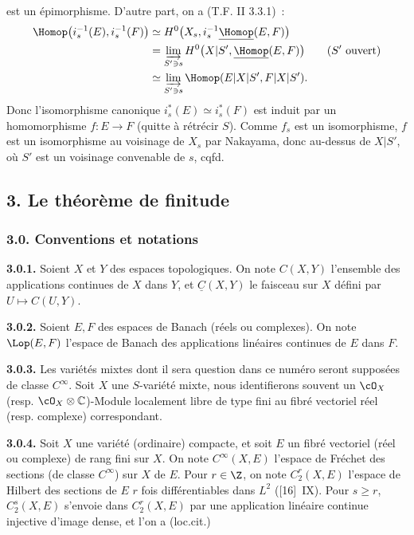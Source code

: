 est un
épimorphisme. D'autre part, on a (T.F. II 3.3.1)~:
\[
\begin{aligned}
  \Homop\bigl(i_s^{-1}(E),i_s^{-1}(F)\bigr)
  &\simeq H^0\bigl(X_s,i_s^{-1}\underline{\Homop}(E,F)\bigr)\\
  &=\varinjlim_{S'\ni s} H^0\bigl(X|S',\underline{\Homop}(E,F)\bigr)\qquad (S'\ \text{ouvert})\\
  &\simeq \varinjlim_{S'\ni s}\Homop(E|X|S',F|X|S').
\end{aligned}
\]
Donc l'isomorphisme canonique $i_s^*(E)\simeq i_s^*(F)$ est induit par un homomorphisme $f:E\to F$ (quitte à rétrécir $S$). Comme $f_s$ est un isomorphisme, $f$ est un isomorphisme au voisinage de $X_s$ par Nakayama, donc au-dessus de $X|S'$, où $S'$ est un voisinage convenable de $s$, cqfd.

\subsection*{3. Le théorème de finitude}

\subsubsection*{3.0. Conventions et notations}
\textbf{3.0.1.} Soient $X$ et $Y$ des espaces topologiques. On note $C(X,Y)$ l'ensemble des applications continues de $X$ dans $Y$, et $\underline C(X,Y)$ le faisceau sur $X$ défini par $U\mapsto C(U,Y)$.

\textbf{3.0.2.} Soient $E,F$ des espaces de Banach (réels ou complexes). On note $\Lop(E,F)$ l'espace de Banach des applications linéaires continues de $E$ dans $F$.

\textbf{3.0.3.} Les variétés mixtes dont il sera question dans ce numéro seront supposées de classe $C^\infty$. Soit $X$ une $S$-variété mixte, nous identifierons souvent un $\cO_X$ (resp. $\cO_X\otimes\mathbb C$)-Module localement libre de type fini au fibré vectoriel réel (resp. complexe) correspondant.

\textbf{3.0.4.} Soit $X$ une variété (ordinaire) compacte, et soit $E$ un fibré vectoriel (réel ou complexe) de rang fini sur $X$. On note $C^\infty(X,E)$ l'espace de Fréchet des sections (de classe $C^\infty$) sur $X$ de $E$. Pour $r\in\Z$, on note $C^r_2(X,E)$ l'espace de Hilbert des sections de $E$ $r$ fois différentiables dans $L^2$ ([16]~IX). Pour $s\ge r$, $C^s_2(X,E)$ s'envoie dans $C^r_2(X,E)$ par une application linéaire continue injective d'image dense, et l'on a (loc.cit.)
